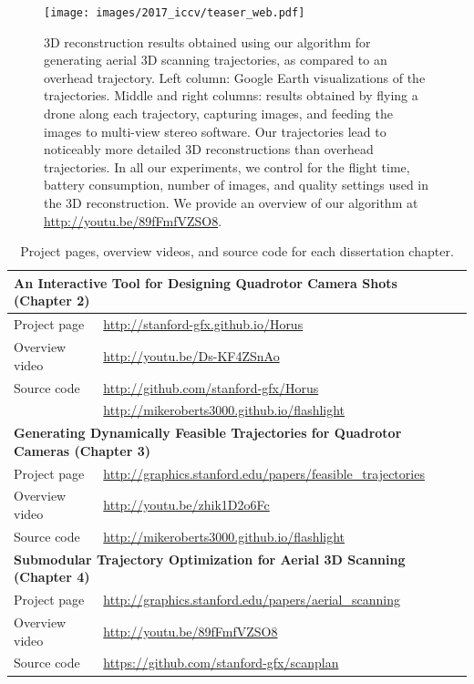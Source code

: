 \begin{figure}[t!]
\begin{center}
\texttt{[image: images/2017\_iccv/teaser\_web.pdf]}
\end{center}
\caption{
3D reconstruction results obtained using our algorithm for generating aerial 3D scanning trajectories, as compared to an overhead trajectory.
Left column: Google Earth visualizations of the trajectories.
Middle and right columns: results obtained by flying a drone along each trajectory, capturing images, and feeding the images to multi-view stereo software.
Our trajectories lead to noticeably more detailed 3D reconstructions than overhead trajectories.
In all our experiments, we control for the flight time, battery consumption, number of images, and quality settings used in the 3D reconstruction.
We provide an overview of our algorithm at \url{http://youtu.be/89fFmfVZSO8}.
}
\label{fig:ch1:teaser_ch4}
\end{figure}

\begin{table}[t]
\centering
\footnotesize
\begin{tabular}{@{}ll@{}}
\toprule
\multicolumn{2}{l}{ \textbf{An Interactive Tool for Designing Quadrotor Camera Shots (Chapter 2)} } \\
\midrule
Project page   & \url{http://stanford-gfx.github.io/Horus}         \\ 
Overview video & \url{http://youtu.be/Ds-KF4ZSnAo}                 \\  
Source code    & \url{http://github.com/stanford-gfx/Horus}        \\
               & \url{http://mikeroberts3000.github.io/flashlight} \\
\midrule
\multicolumn{2}{l}{ \textbf{Generating Dynamically Feasible Trajectories for Quadrotor Cameras (Chapter 3)} } \\
\midrule
Project page   & \url{http://graphics.stanford.edu/papers/feasible_trajectories} \\ 
Overview video & \url{http://youtu.be/zhik1D2o6Fc}                               \\  
Source code    & \url{http://mikeroberts3000.github.io/flashlight}               \\
\midrule
\multicolumn{2}{l}{ \textbf{Submodular Trajectory Optimization for Aerial 3D Scanning (Chapter 4)} } \\
\midrule
Project page   & \url{http://graphics.stanford.edu/papers/aerial_scanning} \\ 
Overview video & \url{http://youtu.be/89fFmfVZSO8}                         \\  
Source code    & \url{https://github.com/stanford-gfx/scanplan}            \\
\bottomrule
\end{tabular}
\normalsize
\caption{
Project pages, overview videos, and source code for each dissertation chapter.
}
\label{tbl:ch1:links}
\end{table}


